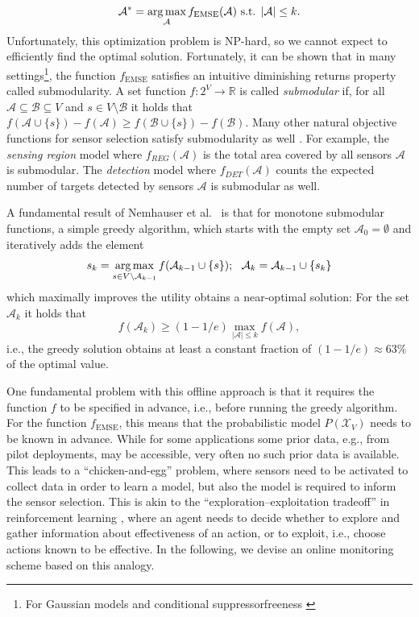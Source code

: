 \documentclass{sig-alternate-dan}
\numberwithin{equation}{section}
\DeclareMathOperator{\EMSE}{EMSE}
\newcommand{\fEMSE}{f_{\EMSE}}
\newcommand{\sensors}{V}
\newcommand{\obj}{\ensuremath{f}} %
\def \argmax {\mathop{\rm arg\,max}}
\newcommand{\cA}{{\mathcal{A}}}
\newcommand{\cB}{{\mathcal{B}}}
\newcommand{\cX}{{\mathcal{X}}}
\begin{document}
$$\cA^*=\argmax_{\cA}\fEMSE(\cA)\text{ s.t. }|\cA|\leq k.$$
Unfortunately, this optimization problem is NP-hard, so we cannot
expect to efficiently find the optimal solution.  Fortunately, it can
be shown \cite{das07} that in many settings\footnote{For Gaussian
models and conditional suppressorfreeness \cite{das07}}, the function
$\fEMSE$ satisfies an intuitive diminishing returns property called
submodularity.  A set function $f:2^{\sensors}\rightarrow\mathbb{R}$
is called \emph{submodular}
%
if, for all
$\cA\subseteq\cB\subseteq\sensors$ and $s\in\sensors\setminus \cB$ it
holds that $f(\cA\cup\{s\})-f(\cA)\geq f(\cB\cup\{s\})-f(\cB)$. Many
other natural objective functions for sensor selection satisfy
submodularity as well \cite{krause07nearoptimal}.  For example, the
\emph{sensing region} model where $\obj_{REG}(\cA)$ is the total area
covered by all sensors $\cA$ is submodular.  The \emph{detection}
model where $\obj_{DET}(\cA)$ counts the expected number of targets
detected by sensors $\cA$ is submodular as well.

A fundamental result of Nemhauser et al.~\cite{nemhauser78} is that
for monotone submodular functions, a simple greedy algorithm, which
starts with the empty set $\cA_{0}=\emptyset$ and iteratively adds the
element $$s_{k}=\argmax_{s\in\sensors\setminus \cA_{k-1}}
f(\cA_{k-1}\cup\{s\});\ \ \cA_{k}=\cA_{k-1}\cup\{s_{k}\}$$ which maximally improves the utility obtains a
near-optimal solution: For the set $\cA_{k}$ it holds that
$$f(\cA_{k})\geq (1-1/e)\max_{|\cA|\leq k}f(\cA),$$ i.e., the greedy
solution obtains at least a constant fraction of $(1-1/e)\approx 63\%$
of the optimal value.

 One fundamental problem with this offline approach is that it requires the function $f$ to be specified in advance, i.e., before running the greedy algorithm.  For the function $\fEMSE$, this means that the probabilistic model $P(\cX_{\sensors})$ needs to be known in advance.  While for some applications some prior data, e.g., from pilot deployments, may be accessible, very often no such prior data is available.  This leads to a ``chicken-and-egg'' problem, where sensors need to be activated to collect data in order to learn a model, but also the model is required to inform the sensor selection.  This is akin to the ``exploration--exploitation tradeoff'' in reinforcement learning \cite{auer02}, where an agent needs to decide whether to explore and gather information about effectiveness of an action, or to exploit, i.e., choose actions known to be effective. In the following, we devise an online monitoring scheme based on this analogy.
\end{document}
